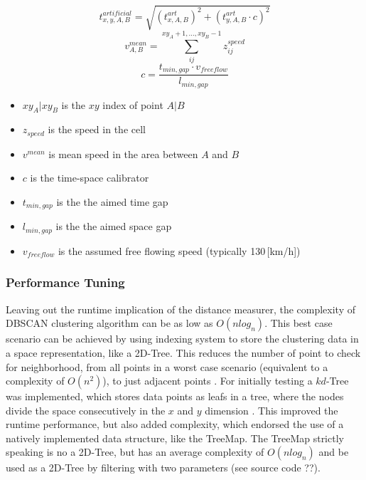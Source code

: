 \begin{equation}
	t_{x,y,A,B}^{artificial} = \sqrt{(t_{x,A,B}^{art})^2 + (t_{y,A,B}^{art} \cdot c)^2}
\end{equation}
\begin{equation}
	v_{A,B}^{mean} = \sum_{ij}^{xy_A + 1,...,xy_B - 1} z_{ij}^{speed}
\end{equation}
\begin{equation}
	c = \frac{t_{min,gap} \cdot v_{freeflow}}{l_{min,gap}}
\end{equation}

\begin{itemize}
	\setlength\itemsep{0.1em}	
	\item[] $xy_A | xy_B$ is the $xy$ index of point $A | B$
	\item[] $z_{speed}$ is the speed in the cell
	\item[] $v^{mean}$ is mean speed in the area between $A$ and $B$
	\item[] $c$ is the time-space calibrator
	\item[] $t_{min,gap}$ is the the aimed time gap
	\item[] $l_{min,gap}$ is the the aimed space gap
	\item[] $v_{freeflow}$ is the assumed free flowing speed (typically 130\,[km/h])
\end{itemize}


\subsubsection{Performance Tuning}
Leaving out the runtime implication of the distance measurer, the complexity of DBSCAN clustering algorithm can be as low as $O(nlog_n)$. This best case scenario can be achieved by using indexing system to store the clustering data in a space representation, like a 2D-Tree. This reduces the number of point to check for neighborhood, from all points in a worst case scenario (equivalent to a complexity of $O(n^2)$), to just adjacent points \parencite{Chauhan2020}. For initially testing a $kd$-Tree was implemented, which stores data points as leafs in a tree, where the nodes divide the space consecutively in the $x$ and $y$ dimension \parencite{Hucker2020,Dalitz2009}. This improved the runtime performance, but also added complexity, which endorsed the use of a natively implemented data structure, like the TreeMap. The TreeMap strictly speaking is no a 2D-Tree, but has an average complexity of $O(nlog_n)$ and be used as a 2D-Tree by filtering with two parameters (see source code ??). \parencite{Baeldung2020_1,Baeldung2020_2}

